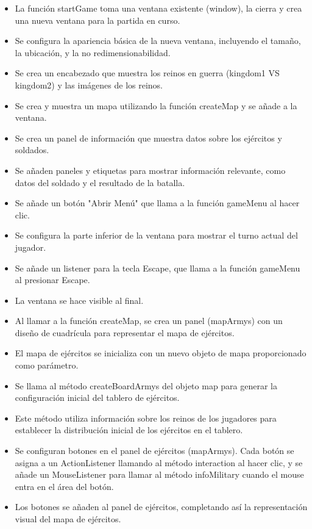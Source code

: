 \documentclass{article}
\begin{document}
    \begin{itemize}	
		\item La función startGame toma una ventana existente (window), la cierra y crea una nueva ventana para la partida en curso.
            \item Se configura la apariencia básica de la nueva ventana, incluyendo el tamaño, la ubicación, y la no redimensionabilidad.
            \item Se crea un encabezado que muestra los reinos en guerra (kingdom1 VS kingdom2) y las imágenes de los reinos.
            \item Se crea y muestra un mapa utilizando la función createMap y se añade a la ventana.
            \item Se crea un panel de información que muestra datos sobre los ejércitos y soldados.
            \item Se añaden paneles y etiquetas para mostrar información relevante, como datos del soldado y el resultado de la batalla.
            \item Se añade un botón "Abrir Menú" que llama a la función gameMenu al hacer clic.
            \item Se configura la parte inferior de la ventana para mostrar el turno actual del jugador.
            \item Se añade un listener para la tecla Escape, que llama a la función gameMenu al presionar Escape.
            \item La ventana se hace visible al final.
	\end{itemize}
    \begin{itemize}	
		\item Al llamar a la función createMap, se crea un panel (mapArmys) con un diseño de cuadrícula para representar el mapa de ejércitos.
            \item El mapa de ejércitos se inicializa con un nuevo objeto de mapa proporcionado como parámetro.
            \item Se llama al método createBoardArmys del objeto map para generar la configuración inicial del tablero de ejércitos.
            \item Este método utiliza información sobre los reinos de los jugadores para establecer la distribución inicial de los ejércitos en el tablero.
            \item Se configuran botones en el panel de ejércitos (mapArmys). Cada botón se asigna a un ActionListener llamando al método interaction al hacer clic, y se añade un MouseListener para llamar al método infoMilitary cuando el mouse entra en el área del botón.
            \item Los botones se añaden al panel de ejércitos, completando así la representación visual del mapa de ejércitos.
	\end{itemize}
\end{document}
